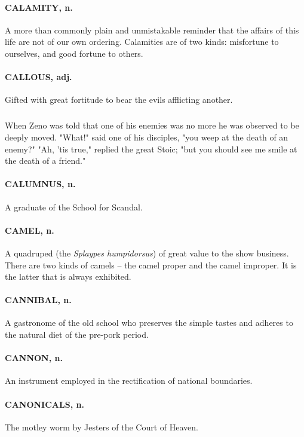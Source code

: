 \documentclass[11pt]{article}
\begin{document}
\paragraph{CALAMITY, n.}  A more than commonly plain and unmistakable reminder
that the affairs of this life are not of our own ordering.  Calamities
are of two kinds:  misfortune to ourselves, and good fortune to
others.

\paragraph{CALLOUS, adj.}  Gifted with great fortitude to bear the evils
afflicting another.
\subparagraph{}   When Zeno was told that one of his enemies was no more he was
observed to be deeply moved.  "What!" said one of his disciples, "you
weep at the death of an enemy?"  "Ah, 'tis true," replied the great
Stoic; "but you should see me smile at the death of a friend."

\paragraph{CALUMNUS, n.}  A graduate of the School for Scandal.

\paragraph{CAMEL, n.}  A quadruped (the {\em Splaypes humpidorsus}) of great value to
the show business.  There are two kinds of camels -- the camel proper
and the camel improper.  It is the latter that is always exhibited.

\paragraph{CANNIBAL, n.}  A gastronome of the old school who preserves the simple
tastes and adheres to the natural diet of the pre-pork period.

\paragraph{CANNON, n.}  An instrument employed in the rectification of national
boundaries.

\paragraph{CANONICALS, n.}  The motley worm by Jesters of the Court of Heaven.
\end{document}
